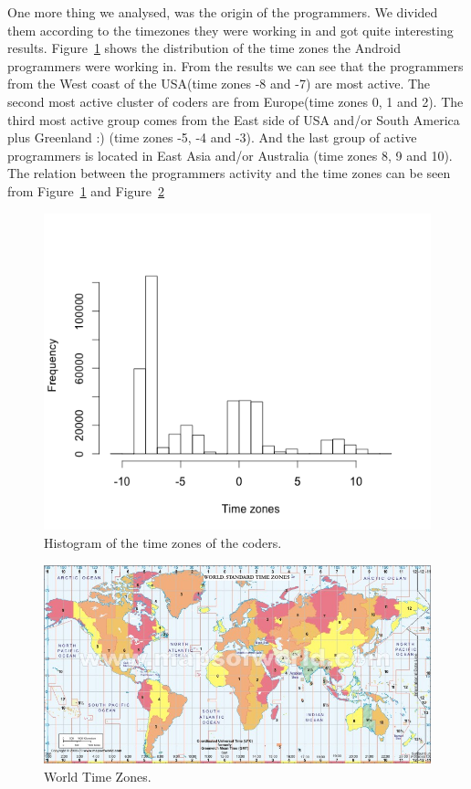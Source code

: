 \documentclass[a4paper,11pt]{report}
\begin{document}
One more thing we analysed, was the origin of the programmers. We divided them according to the timezones they were working in and got quite interesting results. Figure~\ref{fig:time_zones} shows the distribution of the time zones the Android programmers were working in. From the results we can see that the programmers from the West coast of the USA(time zones -8 and -7) are most active. The second most active cluster of coders are from Europe(time zones 0, 1 and 2). The third most active group comes from the East side of USA and/or South America plus Greenland :) (time zones -5, -4 and -3). And the last group of active programmers is located in East Asia and/or Australia (time zones 8, 9 and 10). The relation between the programmers activity and the time zones can be seen from Figure~\ref{fig:time_zones} and Figure~\ref{fig:tz_map}

\begin{figure}[ht!]
\centering
\includegraphics[width=.7\textwidth]{../diagrams/time_zones.png}
\caption{Histogram of the time zones of the coders.}
\label{fig:time_zones}
\end{figure}

\begin{figure}[ht!]
\centering
\includegraphics[width=1.2\textwidth]{../diagrams/World-Time-Zone.jpg}
\caption{World Time Zones.}
\label{fig:tz_map}
\end{figure}
\end{document}
